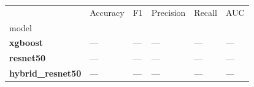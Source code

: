 \begin{tabular}{llllll}
\toprule
 & Accuracy & F1 & Precision & Recall & AUC \\
model &  &  &  &  &  \\
\midrule
\textbf{xgboost} & — & — & — & — & — \\
\textbf{resnet50} & — & — & — & — & — \\
\textbf{hybrid_resnet50} & — & — & — & — & — \\
\bottomrule
\end{tabular}
